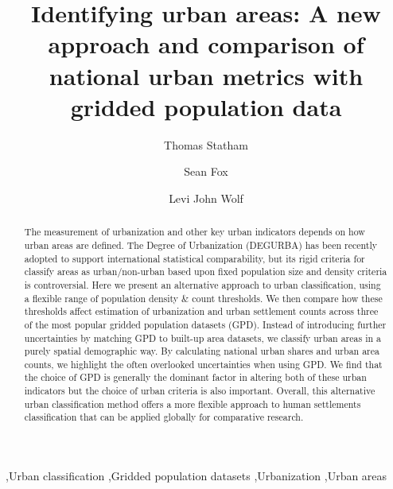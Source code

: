 \documentclass[review]{elsarticle}
\begin{document}
	
\setlength{\parskip}{\baselineskip}
\setlength{\parindent}{0pt}

\begin{frontmatter}
	\title{Identifying urban areas: A new approach and comparison of national urban metrics with gridded population data}
	\author[Affil1]{Thomas Statham}
	\author[Affil1]{Sean Fox}
	\author[Affil1]{Levi John Wolf}
	\address[Affil1]{School of Geographical Sciences, University of Bristol, University Road, Bristol, BS8 1SS, United Kingdom}
		
\begin{abstract}			
	The measurement of urbanization and other key urban indicators depends on how urban areas are defined.
	The Degree of Urbanization (DEGURBA) has been recently adopted to support international statistical comparability, but its rigid criteria for classify areas as urban/non-urban based upon fixed population size and density criteria is controversial.
	Here we present an alternative approach to urban classification, using a flexible range of population density \& count thresholds.
	We then compare how these thresholds affect estimation of urbanization and urban settlement counts across three of the most popular gridded population datasets (GPD).
	Instead of introducing further uncertainties by matching GPD to built-up area datasets, we classify urban areas in a purely spatial demographic way.
	By calculating national urban shares and urban area counts, we highlight the often overlooked uncertainties when using GPD.
	We find that the choice of GPD is generally the dominant factor in altering both of these urban indicators but the choice of urban criteria is also important.
	Overall, this alternative urban classification method offers a more
	flexible approach to human settlements classification that can be applied globally for comparative research.
	
\end{abstract}
\begin{keyword}
	\sep Urban classification \sep Gridded population datasets  \sep Urbanization \sep Urban areas
\end{keyword}

\end{frontmatter}
\end{document}
